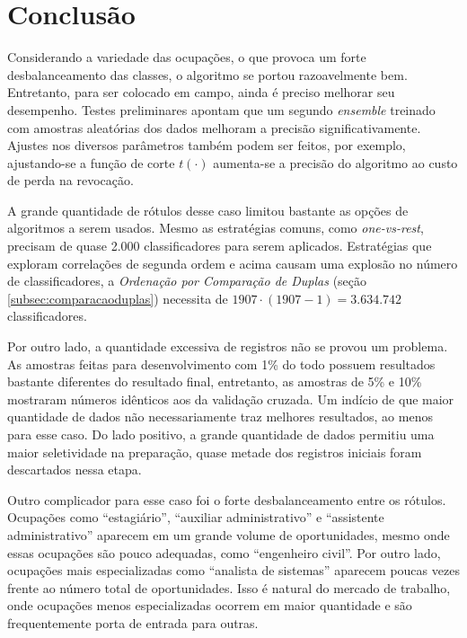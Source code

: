 \documentclass[runningheads,a4paper]{llncs}
\begin{document}
\section{Conclusão} \label{sec:conclusao}

Considerando a variedade das ocupações, o que provoca um forte desbalanceamento das classes, o algoritmo se portou razoavelmente bem. Entretanto, para ser colocado em campo, ainda é preciso melhorar seu desempenho. Testes preliminares apontam que um segundo \textit{ensemble} treinado com amostras aleatórias dos dados melhoram a precisão significativamente. Ajustes nos diversos parâmetros também podem ser feitos, por exemplo, ajustando-se a função de corte $t(\cdot)$ aumenta-se a precisão do algoritmo ao custo de perda na revocação.

A grande quantidade de rótulos desse caso limitou bastante as opções de algoritmos a serem usados. Mesmo as estratégias comuns, como \textit{one-vs-rest}, precisam de quase 2.000 classificadores para serem aplicados. Estratégias que exploram correlações de segunda ordem e acima causam uma explosão no número de classificadores, a \textit{Ordenação por Comparação de Duplas} (seção \ref{subsec:comparacaoduplas}) necessita de $1907 \cdot (1907 - 1) = 3.634.742$ classificadores.

Por outro lado, a quantidade excessiva de registros não se provou um problema. As amostras feitas para desenvolvimento com 1\% do todo possuem resultados bastante diferentes do resultado final, entretanto, as amostras de 5\% e 10\% mostraram números idênticos aos da validação cruzada. Um indício de que maior quantidade de dados não necessariamente traz melhores resultados, ao menos para esse caso. Do lado positivo, a grande quantidade de dados permitiu uma maior seletividade na preparação, quase metade dos registros iniciais foram descartados nessa etapa.

Outro complicador para esse caso foi o forte desbalanceamento entre os rótulos. Ocupações como \enquote{estagiário}, \enquote{auxiliar administrativo} e \enquote{assistente administrativo} aparecem em um grande volume de oportunidades, mesmo onde essas ocupações são pouco adequadas, como \enquote{engenheiro civil}. Por outro lado, ocupações mais especializadas como \enquote{analista de sistemas} aparecem poucas vezes frente ao número total de oportunidades. Isso é natural do mercado de trabalho, onde ocupações menos especializadas ocorrem em maior quantidade e são frequentemente porta de entrada para outras.
\end{document}
